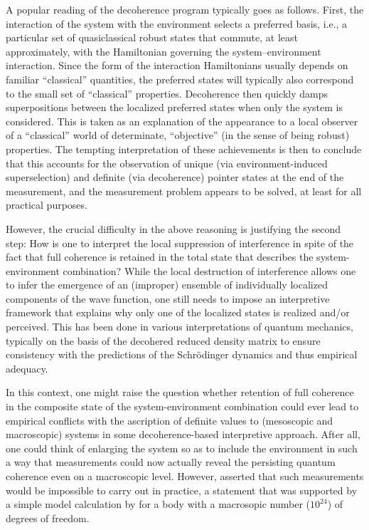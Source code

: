 \documentclass[rmp,aps,amsmath,amsfonts,noshowkeys,noshowpacs,12pt]{revtex4}
\begin{document}
A popular reading of the decoherence program typically goes as
follows. First, the interaction of the system with the environment
selects a preferred basis, i.e., a particular set of quasiclassical
robust states that commute, at least approximately, with the
Hamiltonian governing the system--environment interaction.  Since the
form of the interaction Hamiltonians usually depends on familiar
``classical'' quantities, the preferred states will typically also
correspond to the small set of ``classical'' properties.  Decoherence
then quickly damps superpositions between the localized preferred
states when only the system is considered. This is taken as an
explanation of the appearance to a local observer of a ``classical''
world of determinate, ``objective'' (in the sense of being robust)
properties.  The tempting interpretation of these achievements is then
to conclude that this accounts for the observation of unique (via
environment-induced superselection) and definite (via decoherence)
pointer states at the end of the measurement, and the measurement
problem appears to be solved, at least for all practical purposes.

However, the crucial difficulty in the above reasoning is justifying
the second step: How is one to interpret the local suppression of
interference in spite of the fact that full coherence is retained in
the total state that describes the system-environment combination?
While the local destruction of interference allows one to infer the
emergence of an (improper) ensemble of individually localized
components of the wave function, one still needs to impose an
interpretive framework that explains why only one of the localized
states is realized and/or perceived. This has been done in various
interpretations of quantum mechanics, typically on the basis of the
decohered reduced density matrix to ensure consistency with the
predictions of the Schr\"odinger dynamics and thus empirical adequacy.

In this context, one might raise the question whether retention of
full coherence in the composite state of the system-environment
combination could ever lead to empirical conflicts with the ascription
of definite values to (mesoscopic and macroscopic) systems in some
decoherence-based interpretive approach.  After all, one could think
of enlarging the system so as to include the environment in such a way
that measurements could now actually reveal the persisting quantum
coherence even on a macroscopic level.  However, \citet{Zurek:1982:tv}
asserted that such measurements would be impossible to carry out in
practice, a statement that was supported by a simple model calculation
by \citet[p.~356]{Omnes:1992:gy} for a body with a macrosopic number
($10^{24}$) of degrees of freedom.
\end{document}
